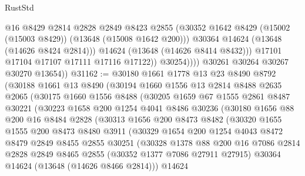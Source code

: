 \begin{lexlean}{RustStd}
\begin{coremodule}
                        @16
                        @8429
                        @2814
                        @2828
                        @2849
                        @8423
                        @2855
                        (@30352 @1642 @8429 (@15002 (@15003 @8429)) (@13648 (@15008 @1642 @200)))
                        @30364
                        @14624
                        (@13648 (@14626 @8424 @2814)))
                      @14624
                      (@13648 (@14626 @8414 @8432)))
                    @17101
                    @17104
                    @17107
                    @17111
                    @17116
                    @17122))
                @30254))))
        @30261
        @30264
        @30267
        @30270
        @13654))
@31162 := @30180
    @1661
    @1778
    @13
    @23
    @8490
    @8792
    (@30188
      @1661
      @13
      @8490
      (@30194
        @1660
        @1556
        @13
        @2814
        @8488
        @2635
        @2065
        (@30175
          @1660
          @1556
          @8488
          (@30205
            @1659
            @67
            @1555
            @2861
            @8487
            @30221
            (@30223
              @1658
              @200
              @1254
              @4041
              @8486
              @30236
              (@30180
                @1656
                @88
                @200
                @16
                @8484
                @2828
                (@30313
                  @1656
                  @200
                  @8473
                  @8482
                  (@30320
                    @1655
                    @1555
                    @200
                    @8473
                    @8480
                    @3911
                    (@30329
                      @1654
                      @200
                      @1254
                      @4043
                      @8472
                      @8479
                      @2849
                      @8455
                      @2855
                      @30251
                      (@30328
                        @1378
                        @88
                        @200
                        @16
                        @7086
                        @2814
                        @2828
                        @2849
                        @8465
                        @2855
                        (@30352 @1377 @7086 @27911 @27915)
                        @30364
                        @14624
                        (@13648 (@14626 @8466 @2814)))
                      @14624

\end{coremodule}
\end{lexlean}
